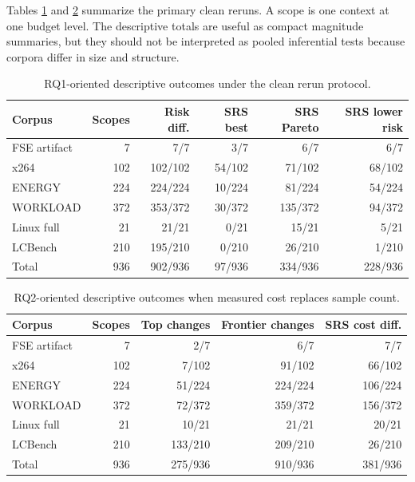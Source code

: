 \documentclass[smallcondensed]{svjour3}
\begin{document}
Tables \ref{tab:rq1-descriptive} and \ref{tab:rq2-descriptive} summarize
the primary clean reruns. A scope is one context at one budget level.
The descriptive totals are useful as compact magnitude summaries, but
they should not be interpreted as pooled inferential tests because
corpora differ in size and structure.

\begin{table}[H]
\caption{RQ1-oriented descriptive outcomes under the clean rerun protocol.}
\label{tab:rq1-descriptive}
\centering
\scriptsize
\begin{tabular}{@{}lrrrrr@{}}
\toprule
Corpus & Scopes & Risk diff. & SRS best & SRS Pareto & SRS lower risk \\
\midrule
FSE artifact & 7 & 7/7 & 3/7 & 6/7 & 6/7 \\
x264 & 102 & 102/102 & 54/102 & 71/102 & 68/102 \\
ENERGY & 224 & 224/224 & 10/224 & 81/224 & 54/224 \\
WORKLOAD & 372 & 353/372 & 30/372 & 135/372 & 94/372 \\
Linux full & 21 & 21/21 & 0/21 & 15/21 & 5/21 \\
LCBench & 210 & 195/210 & 0/210 & 26/210 & 1/210 \\
Total & 936 & 902/936 & 97/936 & 334/936 & 228/936 \\
\bottomrule
\end{tabular}
\end{table}

\begin{table}[H]
\caption{RQ2-oriented descriptive outcomes when measured cost replaces sample count.}
\label{tab:rq2-descriptive}
\centering
\scriptsize
\begin{tabular}{@{}lrrrr@{}}
\toprule
Corpus & Scopes & Top changes & Frontier changes & SRS cost diff. \\
\midrule
FSE artifact & 7 & 2/7 & 6/7 & 7/7 \\
x264 & 102 & 7/102 & 91/102 & 66/102 \\
ENERGY & 224 & 51/224 & 224/224 & 106/224 \\
WORKLOAD & 372 & 72/372 & 359/372 & 156/372 \\
Linux full & 21 & 10/21 & 21/21 & 20/21 \\
LCBench & 210 & 133/210 & 209/210 & 26/210 \\
Total & 936 & 275/936 & 910/936 & 381/936 \\
\bottomrule
\end{tabular}
\end{table}
\end{document}
